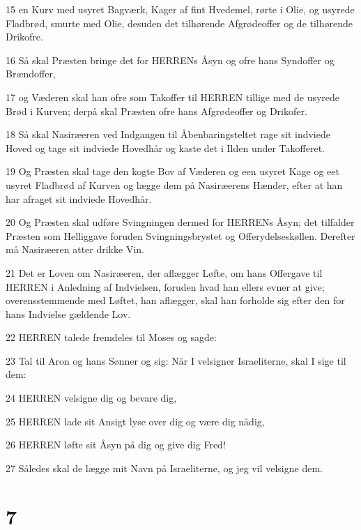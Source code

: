 \par 15 en Kurv med usyret Bagværk, Kager af fint Hvedemel, rørte i Olie, og usyrede Fladbrød, smurte med Olie, desuden det tilhørende Afgrødeoffer og de tilhørende Drikofre.
\par 16 Så skal Præsten bringe det for HERRENs Åsyn og ofre hans Syndoffer og Brændoffer,
\par 17 og Væderen skal han ofre som Takoffer til HERREN tillige med de usyrede Brød i Kurven; derpå skal Præsten ofre hans Afgrødeoffer og Drikofer.
\par 18 Så skal Nasiræeren ved Indgangen til Åbenbaringsteltet rage sit indviede Hoved og tage sit indviede Hovedhår og kaste det i Ilden under Takofferet.
\par 19 Og Præsten skal tage den kogte Bov af Væderen og een usyret Kage og eet usyret Fladbrød af Kurven og lægge dem på Nasiræerens Hænder, efter at han har afraget sit indviede Hovedhår.
\par 20 Og Præsten skal udføre Svingningen dermed for HERRENs Åsyn; det tilfalder Præsten som Helliggave foruden Svingningsbrystet og Offerydelseskøllen. Derefter må Nasiræeren atter drikke Vin.
\par 21 Det er Loven om Nasiræeren, der aflægger Løfte, om hans Offergave til HERREN i Anledning af Indvielsen, foruden hvad han ellers evner at give; overensstemmende med Løftet, han aflægger, skal han forholde sig efter den for hans Indvielse gældende Lov.
\par 22 HERREN talede fremdeles til Moses og sagde:
\par 23 Tal til Aron og hans Sønner og sig: Når I velsigner Israeliterne, skal I sige til dem:
\par 24 HERREN velsigne dig og bevare dig,
\par 25 HERREN lade sit Ansigt lyse over dig og være dig nådig,
\par 26 HERREN løfte sit Åsyn på dig og give dig Fred!
\par 27 Således skal de lægge mit Navn på Israeliterne, og jeg vil velsigne dem.

\chapter{7}

